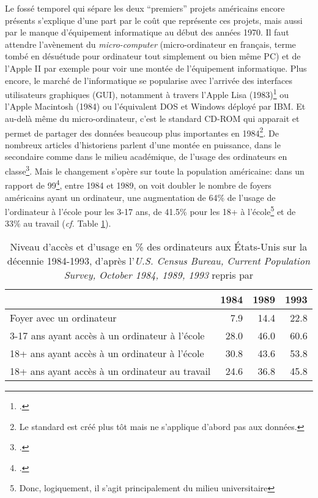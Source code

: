 Le fossé temporel qui sépare les deux \enquote{premiers} projets américains encore présents s'explique d'une part par le coût que représente ces projets, mais aussi par le manque d'équipement informatique au début des années 1970. Il faut attendre l'avènement du \textit{micro-computer} (micro-ordinateur en français, terme tombé en désuétude pour ordinateur tout simplement ou bien même PC) et de l'Apple II par exemple pour voir une montée de l'équipement informatique. Plus encore, le marché de l'informatique se popularise avec l'arrivée des interfaces utilisateurs graphiques (GUI), notamment à travers l'Apple Lisa (1983)\footcite{noauthor_history_2021} ou l'Apple Macintosh (1984) ou l'équivalent DOS et Windows déployé par IBM. Et au-delà même du micro-ordinateur, c'est le standard CD-ROM qui apparait et permet de partager des données beaucoup plus importantes en 1984\footnote{Le standard est créé plus tôt mais ne s'applique d'abord pas aux données.}. De nombreux articles d'historiens parlent d'une montée en puissance, dans le secondaire comme dans le milieu académique, de l'usage des ordinateurs en classe\footcite{simkin_introduction_1989, latousek_fifty_2001}. Mais le changement s'opère sur toute la population américaine: dans un rapport de 99\footcite{kominski1999access}, entre 1984 et 1989, on voit doubler le nombre de foyers américains ayant un ordinateur, une augmentation de 64\% de l'usage de l'ordinateur à l'école pour les 3-17 ans, de 41.5\% pour les 18+ à l'école\footnote{Donc, logiquement, il s'agit principalement du milieu universitaire} et de 33\% au travail (\textit{cf.} Table \ref{tab:computer-ownership}).

\begin{table}[ht]
\centering
\begin{tabular}{l|rrr}
                                               & 1984 & 1989 & 1993 \\ \hline  \hline
Foyer avec un ordinateur                       & 7.9  & 14.4 & 22.8 \\ \hline
3-17 ans ayant accès à un ordinateur à l'école & 28.0 & 46.0 & 60.6 \\
18+ ans ayant accès à un ordinateur à l'école  & 30.8 & 43.6 & 53.8 \\
18+ ans ayant accès à un ordinateur au travail & 24.6 & 36.8 & 45.8 \\ \hline
\end{tabular}
\caption{Niveau d'accès et d'usage en \% des ordinateurs aux États-Unis sur la décennie 1984-1993, d'après l'\textit{U.S. Census Bureau, Current Population Survey, October 1984, 1989, 1993} repris par \cite{kominski1999access}}
\label{tab:computer-ownership}
\end{table}

